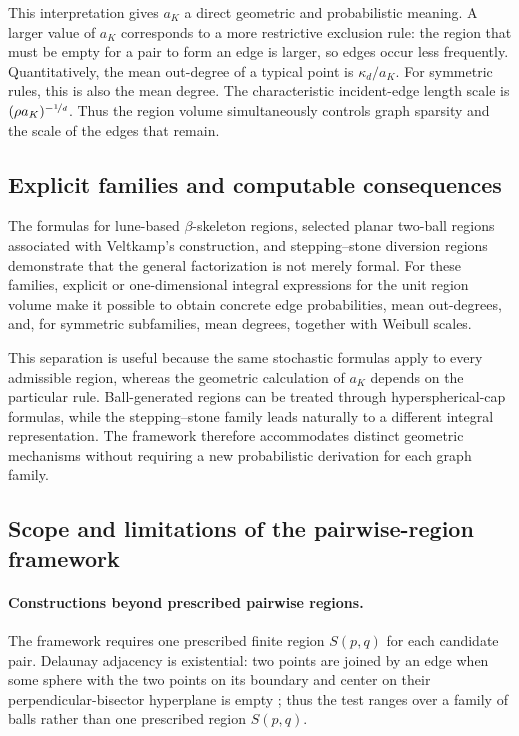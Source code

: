\documentclass[a4paper,fleqn]{cas-dc}
\numberwithin{equation}{section}
\newcommand{\1}{\mathds{1}}
\newcommand{\0}{\mathbf{0}}
\begin{document}
This interpretation gives \(a_K\) a direct geometric and probabilistic
meaning. A larger value of \(a_K\) corresponds to a more restrictive
exclusion rule: the region that must be empty for a pair to form an
edge is larger, so edges occur less frequently. Quantitatively, the
mean out-degree of a typical point is \(\kappa_d/a_K\). For symmetric
rules, this is also the mean degree. The characteristic incident-edge
length scale is \((\rho a_K)^{-\nicefrac{1}{d}}\). Thus the region
volume simultaneously controls graph sparsity and the scale of the
edges that remain.



\subsection{Explicit families and computable consequences}
The formulas for lune-based $\beta$-skeleton regions, selected planar two-ball regions associated with Veltkamp's construction, and stepping--stone diversion regions demonstrate that the general factorization is not merely formal. For these families, explicit or one-dimensional integral expressions for the unit region volume make it possible to obtain concrete edge probabilities, mean out-degrees, and, for symmetric subfamilies, mean degrees,
together with Weibull scales.

This separation is useful because the same stochastic formulas apply to every admissible region, whereas the geometric calculation of $a_K$ depends on the particular rule. Ball-generated regions can be treated through hyperspherical-cap formulas, while the stepping--stone family leads naturally to a different integral representation. The framework therefore accommodates distinct geometric mechanisms without requiring a new probabilistic derivation for each graph family.





\subsection{Scope and limitations of the pairwise-region framework}
\paragraph{Constructions beyond prescribed pairwise regions.}

The framework requires one prescribed finite region $S(p,q)$ for each candidate pair. Delaunay adjacency is existential: two points are joined by an edge when some sphere with the two points on its boundary and center on their perpendicular-bisector hyperplane is empty \citep{devroye1988expected}; thus the test ranges over a family of balls rather than one prescribed region $S(p,q)$.
\end{document}
